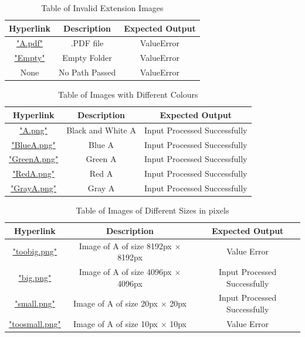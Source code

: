 \documentclass[12pt, titlepage]{article}
\begin{document}
\begin{table}[h!]
  \centering
  \begin{tabular}{|c|c|c|}
    \hline
    \textbf{Hyperlink} & \textbf{Description} & \textbf{Expected Output} \\ \hline
    \hyperref[A.pdf]{"A.pdf"} & .PDF file & ValueError \\ \hline
    \hyperref[Empty]{"Empty"} & Empty Folder & ValueError \\ \hline
    None & No Path Passed & ValueError \\ \hline
  \end{tabular}
  \caption{Table of Invalid Extension Images}
  \label{table_exterr}
\end{table}

\begin{table}[h!]
  \centering
  \begin{tabular}{|c|c|c|}
    \hline
    \textbf{Hyperlink} & \textbf{Description} & \textbf{Expected Output} \\ \hline
    \hyperref[Black and White A]{"A.png"} & Black and White A & Input Processed Successfully \\ \hline
    \hyperref[Blue A]{"BlueA.png"} & Blue A & Input Processed Successfully \\ \hline
    \hyperref[Green A]{"GreenA.png"} & Green A & Input Processed Successfully \\ \hline
    \hyperref[Red A]{"RedA.png"} & Red A & Input Processed Successfully \\ \hline
    \hyperref[Gray A]{"GrayA.png"} & Gray A & Input Processed Successfully \\ \hline
  \end{tabular}
  \caption{Table of Images with Different Colours}
  \label{table_colour}
\end{table}

\begin{table}[h!]
  \centering
  \begin{tabular}{|c|c|c|}
    \hline
    \textbf{Hyperlink} & \textbf{Description} & \textbf{Expected Output} \\ \hline
    \hyperref[Too Big]{"toobig.png"} & Image of A of size 8192px $\times$ 8192px & Value Error \\ \hline
    \hyperref[Big Edge]{"big.png"} & Image of A of size 4096px $\times$ 4096px & Input Processed Successfully \\ \hline
    \hyperref[Small Edge]{"small.png"} & Image of A of size 20px $\times$ 20px & Input Processed Successfully \\ \hline
    \hyperref[Too Small]{"toosmall.png"} & Image of A of size 10px $\times$ 10px & Value Error \\ \hline
  \end{tabular}
  \caption{Table of Images of Different Sizes in pixels}
  \label{table_size}
\end{table}
\end{document}
